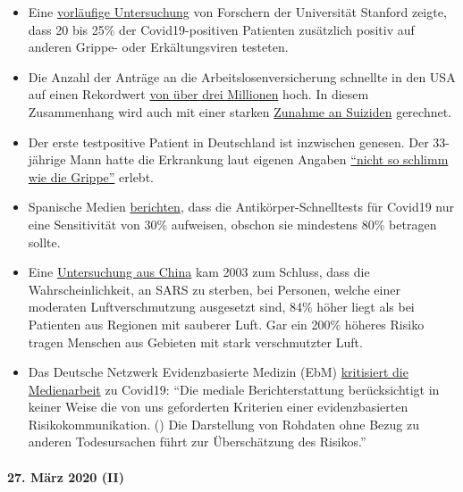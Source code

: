 \begin{itemize}
\tightlist
\item
  Eine
  \href{https://medium.com/@nigam/higher-co-infection-rates-in-covid19-b24965088333}{vorläufige
  Untersuchung} von Forschern der Universität Stanford zeigte, dass 20
  bis 25\% der Covid19-positiven Patienten zusätzlich positiv auf
  anderen Grippe- oder Erkältungsviren testeten.
\item
  Die Anzahl der Anträge an die Arbeitslosenversicherung schnellte in
  den USA auf einen Rekordwert
  \href{https://www.businessinsider.com/us-weekly-jobless-claims-record-coronavirus-unemployment-insurance-labor-recession-2020-3}{von
  über drei Millionen} hoch. In diesem Zusammenhang wird auch mit einer
  starken
  \href{https://twitter.com/KoenSwinkels/status/1243066532390977544}{Zunahme
  an Suiziden} gerechnet.
\item
  Der erste testpositive Patient in Deutschland ist inzwischen genesen.
  Der 33-jährige Mann hatte die Erkrankung laut eigenen Angaben
  \href{https://www.br.de/nachrichten/bayern/coronavirus-patient-nummer-1-wie-ich-die-quarantaene-erlebte,Rrm4Ul8}{``nicht
  so schlimm wie die Grippe''} erlebt.
\item
  Spanische Medien
  \href{https://elpais.com/sociedad/2020-03-25/los-test-rapidos-de-coronavirus-comprados-en-china-no-funcionan.html}{berichten},
  dass die Antikörper-Schnelltests für Covid19 nur eine Sensitivität von
  30\% aufweisen, obschon sie mindestens 80\% betragen sollte.
\item
  Eine
  \href{https://ehjournal.biomedcentral.com/articles/10.1186/1476-069X-2-15}{Untersuchung
  aus China} kam 2003 zum Schluss, dass die Wahrscheinlichkeit, an SARS
  zu sterben, bei Personen, welche einer moderaten Luftverschmutzung
  ausgesetzt sind, 84\% höher liegt als bei Patienten aus Regionen mit
  sauberer Luft. Gar ein 200\% höheres Risiko tragen Menschen aus
  Gebieten mit stark verschmutzter Luft.
\item
  Das Deutsche Netzwerk Evidenzbasierte Medizin (EbM)
  \href{https://www.ebm-netzwerk.de/de/veroeffentlichungen/covid-19}{kritisiert
  die Medienarbeit} zu Covid19: ``Die mediale Berichterstattung
  berücksichtigt in keiner Weise die von uns geforderten Kriterien einer
  evidenzbasierten Risikokommunikation. () Die Darstellung von Rohdaten
  ohne Bezug zu anderen Todesursachen führt zur Überschätzung des
  Risikos.''
\end{itemize}

\hypertarget{27-muxe4rz-2020-ii}{%
\paragraph{27. März 2020 (II)}\label{27-muxe4rz-2020-ii}}

